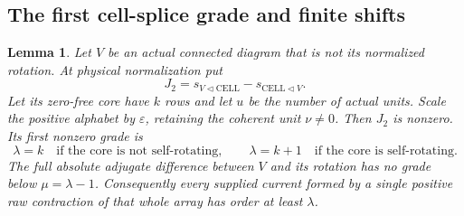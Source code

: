 \documentclass[11pt,a4paper]{amsart}
\numberwithin{equation}{section}
\theoremstyle{plain}
\newtheorem{lemma}[theorem]{Lemma}
\theoremstyle{definition}
\begin{document}
\subsection{The first cell-splice grade and finite shifts}

\begin{lemma}
\label{sc:splice-nonzero}
Let \(V\) be an actual connected diagram that is not its normalized
rotation.  At physical normalization put
\[
 J_2=s_{V\triangleleft\mathrm{CELL}}
              -s_{\mathrm{CELL}\triangleleft V}.
\]
Let its zero-free core have \(k\) rows and let \(u\) be the number of actual
units.  Scale the positive alphabet by \(\varepsilon\), retaining the
coherent unit \(\nu\ne0\).  Then \(J_2\) is nonzero.  Its first nonzero
grade is
\[
 \lambda=k\quad\text{if the core is not self-rotating},\qquad
 \lambda=k+1\quad\text{if the core is self-rotating}.
\]
The full absolute adjugate difference between \(V\) and its rotation has
no grade below \(\mu=\lambda-1\).  Consequently every supplied current
formed by a single positive raw contraction of that whole array has
order at least \(\lambda\).
\end{lemma}
\end{document}
